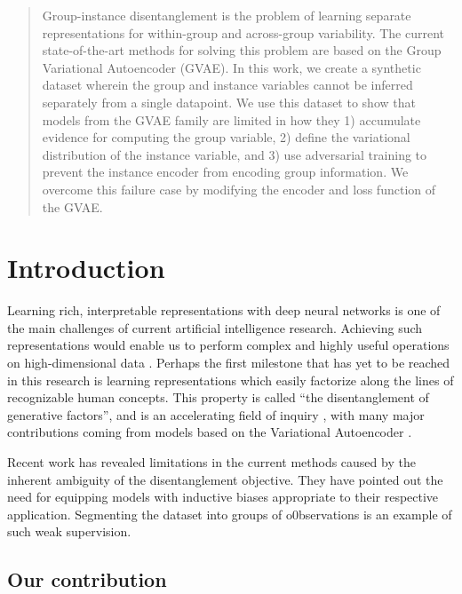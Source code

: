 \documentclass{article}
\begin{document}
\printAffiliationsAndNotice{\icmlEqualContribution} %

\begin{abstract}
Group-instance disentanglement is the problem of learning separate representations for within-group and across-group variability. The current state-of-the-art methods for solving this problem are based on the Group Variational Autoencoder (GVAE). In this work, we create a synthetic dataset wherein the group and instance variables cannot be inferred separately from a single datapoint. We use this dataset to show that models from the GVAE family are limited in how they 1) accumulate evidence for computing the group variable, 2) define the variational distribution of the instance variable, and 3) use adversarial training to prevent the instance encoder from encoding group information. We overcome this failure case by modifying the encoder and loss function of the GVAE.
\end{abstract}

\section{Introduction}

Learning rich, interpretable representations with deep neural networks is one of the main challenges of current artificial intelligence research. Achieving such representations would enable us to perform complex and highly useful operations on high-dimensional data \citep{bengio2013representation}. Perhaps the first milestone that has yet to be reached in this research is learning representations which easily factorize along the lines of recognizable human concepts. This property is called ``the disentanglement of generative factors'', and is an accelerating field of inquiry \citep{tschannen2018recent}, with many major contributions coming from models based on the Variational Autoencoder \citep{kingma2013auto, rezende2014stochastic}.

Recent work \citep{locatello2018challenging,van2019disentangled} has revealed limitations in the current methods caused by the inherent ambiguity of the disentanglement objective. They have pointed out the need for equipping models with inductive biases appropriate to their respective application. Segmenting the dataset into groups of o0bservations is an example of such weak supervision.

\subsection{Our contribution}
\end{document}
